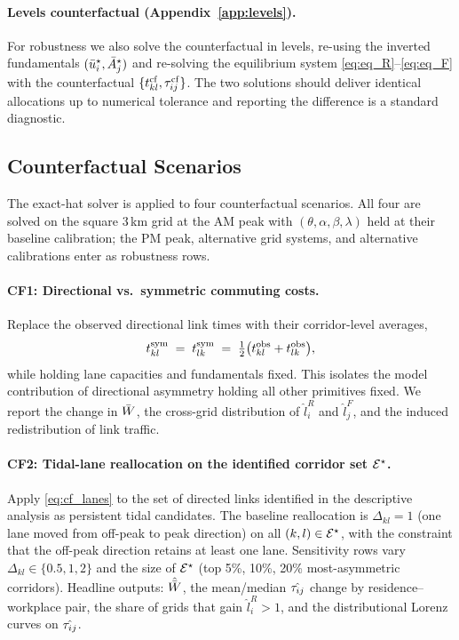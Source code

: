 \paragraph{Levels counterfactual (Appendix~\ref{app:levels}).}
For robustness we also solve the counterfactual in levels,
re-using the inverted fundamentals
$(\bar u_i^{\star},\bar A_j^{\star})$ and re-solving the equilibrium
system \eqref{eq:eq_R}--\eqref{eq:eq_F} with the counterfactual
$\{t_{kl}^{\mathrm{cf}},\tau_{ij}^{\mathrm{cf}}\}$.  The two solutions should deliver
identical allocations up to numerical tolerance and reporting the
difference is a standard diagnostic.

\subsection{Counterfactual Scenarios}\label{ssec:cf}

The exact-hat solver is applied to four counterfactual scenarios.
All four are solved on the square 3\,km grid at the AM peak with
$(\theta,\alpha,\beta,\lambda)$ held at their baseline calibration;
the PM peak, alternative grid systems, and alternative calibrations
enter as robustness rows.

\paragraph{CF1: Directional vs.\ symmetric commuting costs.}
Replace the observed directional link times with their corridor-level
averages,
\[
  t_{kl}^{\mathrm{sym}}\;=\;t_{lk}^{\mathrm{sym}}
  \;=\;\tfrac{1}{2}\bigl(t_{kl}^{\mathrm{obs}}+t_{lk}^{\mathrm{obs}}\bigr),
\]
while holding lane capacities and fundamentals fixed.  This isolates
the model contribution of directional asymmetry holding all other
primitives fixed.  We report the change in $\bar W$, the cross-grid
distribution of $\hat l_i^R$ and $\hat l_j^F$, and the induced
redistribution of link traffic.

\paragraph{CF2: Tidal-lane reallocation on the identified corridor
set $\mathcal E^\star$.}
Apply \eqref{eq:cf_lanes} to the set of directed links
identified in the descriptive analysis as persistent tidal
candidates.  The baseline reallocation is
$\Delta_{kl}=1$ (one lane moved from off-peak to peak direction)
on all $(k,l)\in\mathcal E^\star$, with the constraint that the off-peak
direction retains at least one lane.  Sensitivity rows vary
$\Delta_{kl}\in\{0.5,1,2\}$ and the size of $\mathcal E^\star$ (top 5\%,
10\%, 20\% most-asymmetric corridors).  Headline outputs:
$\hat{\bar W}$, the mean/median $\hat{\tau_{ij}}$ change by residence--workplace
pair, the share of grids that gain $\hat l_i^R>1$, and the
distributional Lorenz curves on $\hat{\tau_{ij}}$.

